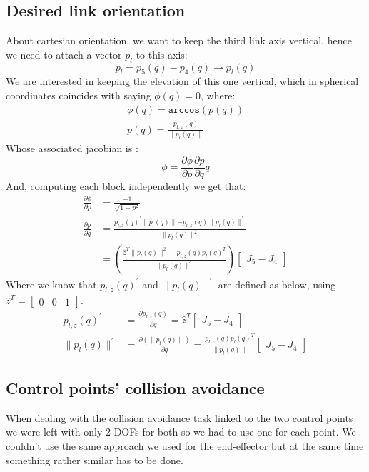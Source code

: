 \documentclass[12pt, a4paper]{article}
\newcommand{\diff}[2]{\frac{\partial{#1}}{\partial{#2}}}
\newcommand{\norm}[1]{\parallel{#1}\parallel}
\begin{document}
\subsection[Task 2]{Desired link orientation}
About cartesian orientation, we want to keep the third link axis vertical, hence we need to attach a vector $p_l$ to this axis:
\[
p_l = p_5(q) - p_4(q) \rightarrow p_l(q)
\]
We are interested in keeping the elevation of this one vertical, which in spherical coordinates coincides with saying $\phi(q) = 0$, where:
\begin{gather*}
\phi(q) = \texttt{arccos}(p(q))\\
p(q) = \frac{p_{l,z}(q)}{\norm{p_l(q)}}
\end{gather*}
Whose associated jacobian is :
\begin{equation}
\dot{\phi} = \diff{\phi}{p}\diff{p}{q}\dot{q}
\end{equation}
And, computing each block independently we get that:
\begin{align}
\diff{\phi}{p} &= \frac{-1}{\sqrt{1-p^2}}\\
\diff{p}{q} &= \frac{p_{l,z}(q)^{'}\norm{p_l(q)} - p_{l,z}(q)\norm{p_l(q)}^{'}}{\norm{p_l(q)}^2} \nonumber \\
&= (\frac{\hat{z}^T\norm{p_l(q)}^2 - p_{l,z}(q)p_l(q)^T}{\norm{p_l(q)}^3})\begin{bmatrix}
J_5 - J_4
\end{bmatrix}
\end{align}
Where we know that $p_{l,z}(q)^{'}$ and $\norm{p_{l}(q)}^{'}$ are defined as below, using $\hat{z}^T = \begin{bmatrix}
0&0&1
\end{bmatrix}$.
\begin{align*}
p_{l,z}(q)^{'}&= \diff{p_{l,z}(q)}{q} = \hat{z}^T\begin{bmatrix}
J_5 - J_4
\end{bmatrix} \\
\norm{p_l(q)}^{'}&=\diff{(\norm{p_l(q)})}{q}= \frac{p_{l,z}(q)p_l(q)^T}{\norm{p_l(q)}}\begin{bmatrix}
J_5-J_4
\end{bmatrix}
\end{align*}


\subsection[Tasks 3 \& 4]{Control points' collision avoidance}
When dealing with the collision avoidance task linked to the two control points we were left with only 2 DOFs for both so we had to use one for each point. We couldn't use the same approach we used for the end-effector but at the same time something rather similar has to be done. 
\end{document}
